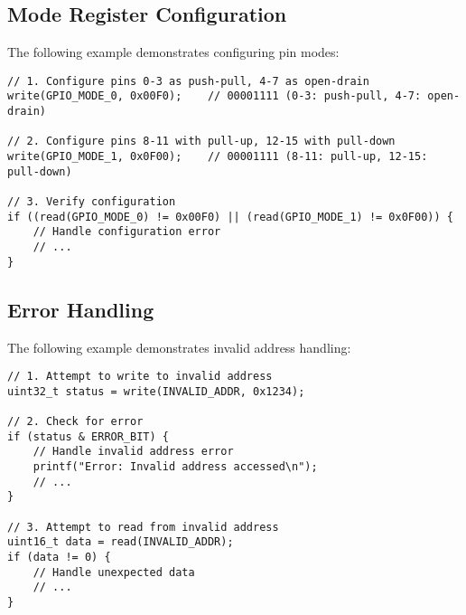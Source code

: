 \subsection{Mode Register Configuration}
The following example demonstrates configuring pin modes:

\begin{verbatim}
// 1. Configure pins 0-3 as push-pull, 4-7 as open-drain
write(GPIO_MODE_0, 0x00F0);    // 00001111 (0-3: push-pull, 4-7: open-drain)

// 2. Configure pins 8-11 with pull-up, 12-15 with pull-down
write(GPIO_MODE_1, 0x0F00);    // 00001111 (8-11: pull-up, 12-15: pull-down)

// 3. Verify configuration
if ((read(GPIO_MODE_0) != 0x00F0) || (read(GPIO_MODE_1) != 0x0F00)) {
    // Handle configuration error
    // ...
}
\end{verbatim}

\subsection{Error Handling}
The following example demonstrates invalid address handling:

\begin{verbatim}
// 1. Attempt to write to invalid address
uint32_t status = write(INVALID_ADDR, 0x1234);

// 2. Check for error
if (status & ERROR_BIT) {
    // Handle invalid address error
    printf("Error: Invalid address accessed\n");
    // ...
}

// 3. Attempt to read from invalid address
uint16_t data = read(INVALID_ADDR);
if (data != 0) {
    // Handle unexpected data
    // ...
}
\end{verbatim}